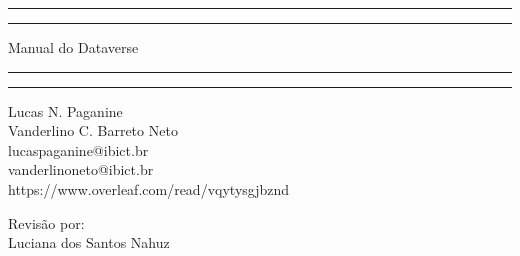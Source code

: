\documentclass[12pt,hidelinks]{article}
\begin{document}
\begin{titlepage}
	\centering %
	\scshape %
	\vspace*{1.5\baselineskip} %

	\rule{13cm}{1.6pt}\vspace*{-\baselineskip}\vspace*{2pt} %
	\rule{13cm}{0.4pt} %
	
		\vspace{0.75\baselineskip} %
	{	\Huge Manual do Dataverse\\ 
			\vspace{4mm}}
		\vspace{0.75\baselineskip} %
	\rule{13cm}{0.4pt}\vspace*{-\baselineskip}\vspace{3.2pt} %
	\rule{13cm}{1.6pt} %
	
		\vspace{1.75\baselineskip} %
	{\large Lucas N. Paganine\\ Vanderlino C. Barreto Neto \\
		\vspace*{1.2\baselineskip}
	lucaspaganine@ibict.br\\ vanderlinoneto@ibict.br} \\https://www.overleaf.com/read/vqytysgjbznd\\
	\vspace*{1.2\baselineskip}
	
	Revisão por:\\
	\small Luciana dos Santos Nahuz\\
	
	
	
	\vfill
\end{titlepage}

\listoffigures

\newpage

\listoftables

\newpage

\tableofcontents
\vfill
\newpage
{}
\end{document}

